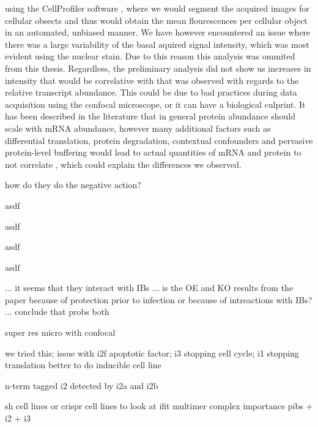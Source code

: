 using the CellProfiler software \cite{McQuin2018CellProfilerBiology}, where we would segment the acquired images for cellular obsects and thus would obtain the mean flourescences per cellular object in an automated, unbiased manner. We have however encountered an issue where there was a large variability of the basal aquired signal intensity, which was most evident using the nuclear stain. Due to this reason this analysis was ommited from this thesis. Regardless, the preliminary analysis did not show us increases in intensity that would be correlative with that was observed with regards to the relative transcript abundance. This could be due to bad practices during data acquisition using the confocal microscope, or it can have a biological culprint. It has been described in the literature that in general protein abundance should scale with mRNA abundance, however many additional factors such as differential translation, protein degradation, contextual confounders and pervasive protein-level buffering would lead to actual quantities of mRNA and protein to not correlate \cite{Liu2016OnAbundance, Buccitelli2020MRNAsControl}, which could explain the differences we observed.

how do they do the negative action?

asdf

asdf

asdf

asdf


... it seems that they interact with IBs ... is the OE and KO results from the paper because of protection prior to infection or because of intreactions with IBs? ... conclude that probs both



super res micro with confocal


we tried this; issue with i2f apoptotic factor; i3 stopping cell cycle; i1 stopping translation
better to do inducible cell line

n-term tagged i2 detected by i2a and i2b

sh cell lines or crispr cell lines to look at ifit multimer complex importance
pibs + i2 + i3

